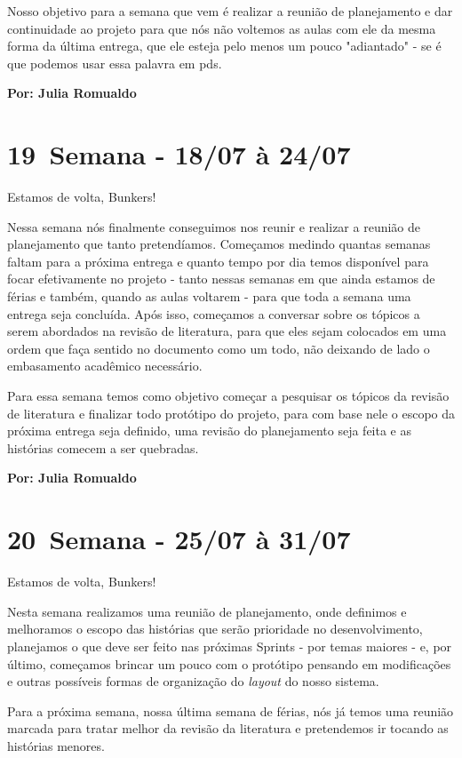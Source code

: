 Nosso objetivo para a semana que vem é realizar a reunião de planejamento e dar continuidade ao projeto para que nós não voltemos as aulas com ele da mesma forma da última entrega, que ele esteja pelo menos um pouco "adiantado" - se é que podemos usar essa palavra em \acs{pds}.

\textbf{Por: Julia Romualdo}

\section{19\textordfeminine \, Semana - 18/07 à 24/07}
Estamos de volta, Bunkers!

Nessa semana nós finalmente conseguimos nos reunir e realizar a reunião de planejamento que tanto pretendíamos. Começamos medindo quantas semanas faltam para a próxima entrega e quanto tempo por dia temos disponível para focar efetivamente no projeto - tanto nessas semanas em que ainda estamos de férias e também, quando as aulas voltarem - para que toda a semana uma entrega seja concluída. Após isso, começamos a conversar sobre os tópicos a serem abordados na revisão de literatura, para que eles sejam colocados em uma ordem que faça sentido no documento como um todo, não deixando de lado o embasamento acadêmico necessário. 

Para essa semana temos como objetivo começar a pesquisar os tópicos da revisão de literatura e finalizar todo protótipo do projeto, para com base nele o escopo da próxima entrega seja definido, uma revisão do planejamento seja feita e as histórias comecem a ser quebradas.

\textbf{Por: Julia Romualdo}

\section{20\textordfeminine \, Semana - 25/07 à 31/07}
Estamos de volta, Bunkers!

Nesta semana realizamos uma reunião de planejamento, onde definimos e melhoramos o escopo das histórias que serão prioridade no desenvolvimento, planejamos o que deve ser feito nas próximas \glspl{Sprint} - por temas maiores - e, por último, começamos brincar um pouco com o protótipo pensando em modificações e outras possíveis formas de organização do \textit{layout} do nosso sistema.

Para a próxima semana, nossa última semana de férias, nós já temos uma reunião marcada para tratar melhor da revisão da literatura e pretendemos ir tocando as histórias menores.

